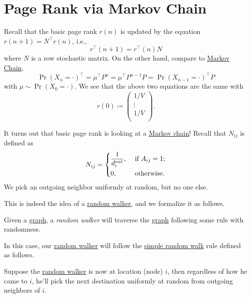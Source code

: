 \section{Page Rank via Markov Chain}
Recall that the basic page rank \(r(n)\) is updated by the equation \(r(n+1) = N^{\top}r(n)\), i.e.,
\[
	r^{\top}(n+1) = r^{\top}(n)N
\]
where \(N\) is a row stochastic matrix. On the other hand, compare to \hyperref[def:Markov-chain]{Markov Chain},
\[
	\Pr(X_n = \cdot)^{\top} = \mu^{\top}P^n = \mu^{\top}P^{n-1}P = \Pr(X_{n-1} = \cdot)^{\top}P
\]
with \(\mu\sim \Pr(X_0 = \cdot)\). We see that the above two equations are the same with
\[
	r(0)\coloneqq \begin{pmatrix}
		1/V    \\
		\vdots \\
		1/V    \\
	\end{pmatrix}.
\]

\begin{remark}
	It turns out that basic page rank is looking at a \hyperref[def:Markov-chain]{Markov chain}! Recall that \(N_{ij}\) is defined as
	\[
		N_{ij} = \begin{dcases}
			\frac{1}{d_i^{out}}, & \text{ if }A_{ij}= 1; \\
			0,                   & \text{ otherwise}.
		\end{dcases}
	\]
	We pick an outgoing neighbor uniformly at random, but no one else.
\end{remark}

This is indeed the idea of a \hyperref[def:random-walker]{random walker}, and we formalize it as follows.
\begin{definition}\label{def:random-walker}
	Given a \hyperref[def:graph]{graph}, a \emph{random walker} will traverse the \hyperref[def:graph]{graph} following some rule with randomness.
\end{definition}

In this case, our \hyperref[def:random-walker]{random walker} will follow the \hyperref[def:simple-random-walk]{simple random walk} rule defined as follows.
\begin{definition}\label{def:simple-random-walk}
	Suppose the \hyperref[def:random-walker]{random walker} is now at location (node) \(i\), then regardless of how he came to \(i\), he'll pick the next destination uniformly at random from outgoing neighbors of \(i\).
	\begin{center}
	\end{center}
\end{definition}

